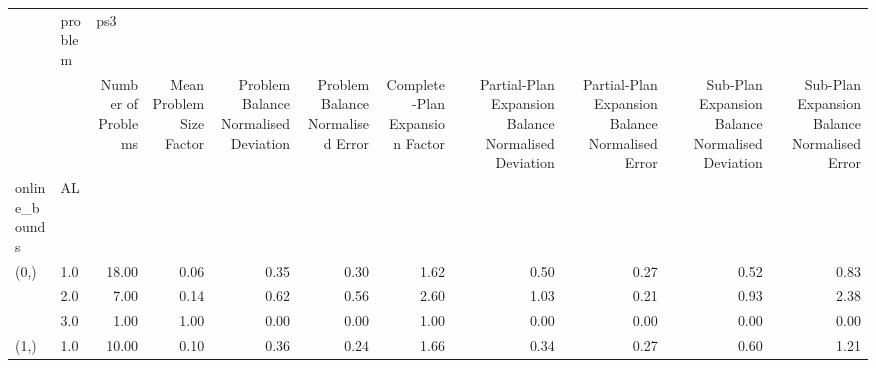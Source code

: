 \begin{tabular}{llrrrrrrrrr}
\toprule
     & problem & \multicolumn{9}{l}{ps3} \\
     & {} & Number of Problems & Mean Problem Size Factor & Problem Balance Normalised Deviation & Problem Balance Normalised Error & Complete-Plan Expansion Factor & Partial-Plan Expansion Balance Normalised Deviation & Partial-Plan Expansion Balance Normalised Error & Sub-Plan Expansion Balance Normalised Deviation & Sub-Plan Expansion Balance Normalised Error \\
online\_bounds & AL &                    &                          &                                      &                                  &                                &                                                     &                                                 &                                                 &                                             \\
\midrule
(0,) & 1.0 &              18.00 &                     0.06 &                                 0.35 &                             0.30 &                           1.62 &                                               0.50 &                                            0.27 &                                            0.52 &                                        0.83 \\
     & 2.0 &               7.00 &                     0.14 &                                 0.62 &                             0.56 &                           2.60 &                                               1.03 &                                            0.21 &                                            0.93 &                                        2.38 \\
     & 3.0 &               1.00 &                     1.00 &                                 0.00 &                             0.00 &                           1.00 &                                               0.00 &                                            0.00 &                                            0.00 &                                        0.00 \\
(1,) & 1.0 &              10.00 &                     0.10 &                                 0.36 &                             0.24 &                           1.66 &                                               0.34 &                                            0.27 &                                            0.60 &                                        1.21 \\

\end{tabular}
